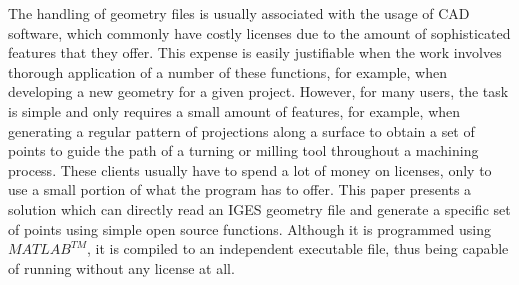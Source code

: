 	The handling of geometry files is usually associated with the usage of CAD software, which commonly have costly licenses due to the amount of sophisticated features that they offer. This expense is easily justifiable when the work involves thorough application of a number of these functions, for example, when developing a new geometry for a given project. However, for many users, the task is simple and only requires a small amount of features, for example, when generating a regular pattern of projections along a surface to obtain a set of points to guide the path of a turning or milling tool throughout a machining process. These clients usually have to spend a lot of money on licenses, only to use a small portion of what the program has to offer.
	This paper presents a solution which can directly read an IGES geometry file and generate a specific set of points using simple open source functions. Although it is programmed using $MATLAB^{TM}$, it is compiled to an independent executable file, thus being capable of running without any license at all.
